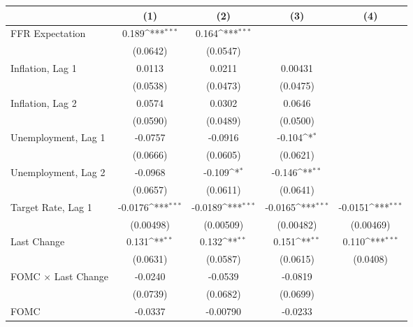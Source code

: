 {
\def\sym#1{\ifmmode^{#1}\else\(^{#1}\)\fi}
\begin{tabular}{l*{4}{c}}
\toprule
                &\multicolumn{1}{c}{(1)}         &\multicolumn{1}{c}{(2)}         &\multicolumn{1}{c}{(3)}         &\multicolumn{1}{c}{(4)}         \\
\midrule
FFR Expectation &    0.189\sym{***}&    0.164\sym{***}&                  &                  \\
                & (0.0642)         & (0.0547)         &                  &                  \\
Inflation, Lag 1&   0.0113         &   0.0211         &  0.00431         &                  \\
                & (0.0538)         & (0.0473)         & (0.0475)         &                  \\
Inflation, Lag 2&   0.0574         &   0.0302         &   0.0646         &                  \\
                & (0.0590)         & (0.0489)         & (0.0500)         &                  \\
Unemployment, Lag 1&  -0.0757         &  -0.0916         &   -0.104\sym{*}  &                  \\
                & (0.0666)         & (0.0605)         & (0.0621)         &                  \\
Unemployment, Lag 2&  -0.0968         &   -0.109\sym{*}  &   -0.146\sym{**} &                  \\
                & (0.0657)         & (0.0611)         & (0.0641)         &                  \\
Target Rate, Lag 1&  -0.0176\sym{***}&  -0.0189\sym{***}&  -0.0165\sym{***}&  -0.0151\sym{***}\\
                &(0.00498)         &(0.00509)         &(0.00482)         &(0.00469)         \\
Last Change     &    0.131\sym{**} &    0.132\sym{**} &    0.151\sym{**} &    0.110\sym{***}\\
                & (0.0631)         & (0.0587)         & (0.0615)         & (0.0408)         \\
FOMC $\times$ Last Change&  -0.0240         &  -0.0539         &  -0.0819         &                  \\
                & (0.0739)         & (0.0682)         & (0.0699)         &                  \\
FOMC            &  -0.0337         & -0.00790         &  -0.0233         &                  \\

\end{tabular}}
